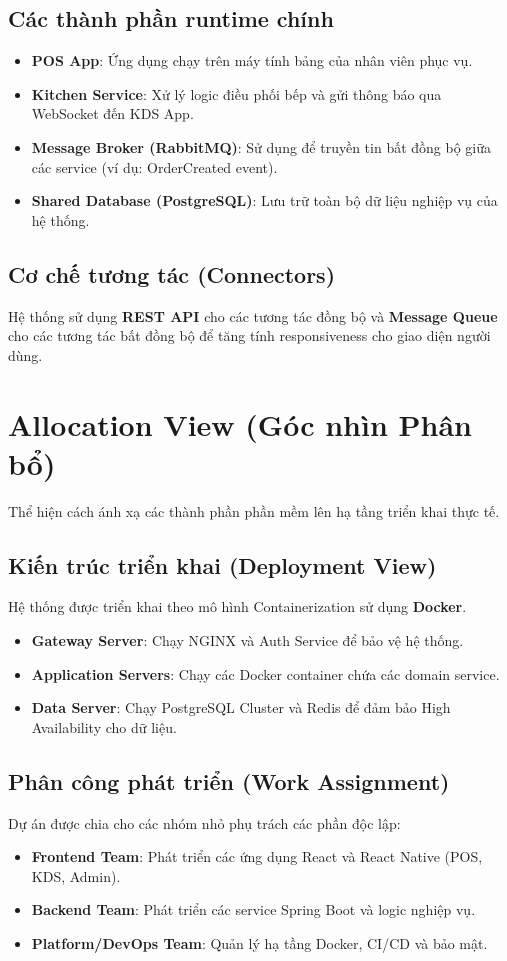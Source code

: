 \subsection{Các thành phần runtime chính}
\begin{itemize}
    \item \textbf{POS App}: Ứng dụng chạy trên máy tính bảng của nhân viên phục vụ.
    \item \textbf{Kitchen Service}: Xử lý logic điều phối bếp và gửi thông báo qua WebSocket đến KDS App.
    \item \textbf{Message Broker (RabbitMQ)}: Sử dụng để truyền tin bất đồng bộ giữa các service (ví dụ: OrderCreated event).
    \item \textbf{Shared Database (PostgreSQL)}: Lưu trữ toàn bộ dữ liệu nghiệp vụ của hệ thống.
\end{itemize}

\subsection{Cơ chế tương tác (Connectors)}
Hệ thống sử dụng \textbf{REST API} cho các tương tác đồng bộ và \textbf{Message Queue} cho các tương tác bất đồng bộ để tăng tính responsiveness cho giao diện người dùng.

\section{Allocation View (Góc nhìn Phân bổ)}

Thể hiện cách ánh xạ các thành phần phần mềm lên hạ tầng triển khai thực tế.

\subsection{Kiến trúc triển khai (Deployment View)}
Hệ thống được triển khai theo mô hình Containerization sử dụng \textbf{Docker}.
\begin{itemize}
    \item \textbf{Gateway Server}: Chạy NGINX và Auth Service để bảo vệ hệ thống.
    \item \textbf{Application Servers}: Chạy các Docker container chứa các domain service.
    \item \textbf{Data Server}: Chạy PostgreSQL Cluster và Redis để đảm bảo High Availability cho dữ liệu.
\end{itemize}

\subsection{Phân công phát triển (Work Assignment)}
Dự án được chia cho các nhóm nhỏ phụ trách các phần độc lập:
\begin{itemize}
    \item \textbf{Frontend Team}: Phát triển các ứng dụng React và React Native (POS, KDS, Admin).
    \item \textbf{Backend Team}: Phát triển các service Spring Boot và logic nghiệp vụ.
    \item \textbf{Platform/DevOps Team}: Quản lý hạ tầng Docker, CI/CD và bảo mật.
\end{itemize}

